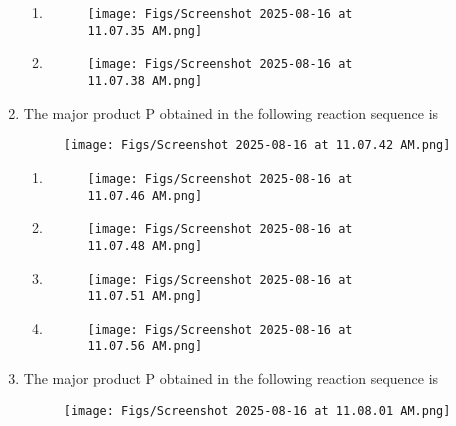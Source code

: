 \documentclass[12pt]{article}
\begin{document}
\begin{enumerate}
\begin{enumerate}
\item  \begin{figure}[H]
\centering
\texttt{[image: Figs/Screenshot 2025-08-16 at 11.07.35 AM.png]}
\caption{}
\end{figure}

\item  
\begin{figure}[H]
\centering
\texttt{[image: Figs/Screenshot 2025-08-16 at 11.07.38 AM.png]}
\caption{}
\end{figure}

\end{enumerate}


\item The major product P obtained in the following reaction sequence is
\begin{figure}[H]
\centering
\texttt{[image: Figs/Screenshot 2025-08-16 at 11.07.42 AM.png]}
\caption{}
\end{figure}
  

\begin{enumerate} 
    \item \begin{figure}[H]
\centering
\texttt{[image: Figs/Screenshot 2025-08-16 at 11.07.46 AM.png]}
\caption{}
\end{figure}

\item  \begin{figure}[H]
\centering
\texttt{[image: Figs/Screenshot 2025-08-16 at 11.07.48 AM.png]}
\caption{}
\end{figure}


\item  \begin{figure}[H]
\centering
\texttt{[image: Figs/Screenshot 2025-08-16 at 11.07.51 AM.png]}
\caption{}
\end{figure}

\item  
\begin{figure}[H]
\centering
\texttt{[image: Figs/Screenshot 2025-08-16 at 11.07.56 AM.png]}
\caption{}
\end{figure}

\end{enumerate}


\item The major product P obtained in the following reaction sequence is
\begin{figure}[H]
\centering
\texttt{[image: Figs/Screenshot 2025-08-16 at 11.08.01 AM.png]}
\caption{}
\end{figure}
  


\end{enumerate}
\end{document}
